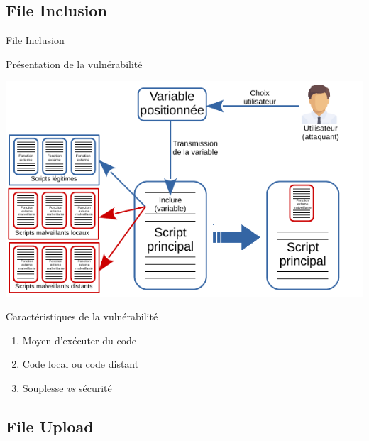 \documentclass[8pt]{beamer}
\begin{document}
\subsection{File Inclusion}

\begin{frame}{File Inclusion}

\begin{block}{Présentation de la vulnérabilité}

\begin{center}
	\includegraphics[scale=.8]{../images/include_hacked.pdf}
\end{center}

\end{block}

\begin{block}{Caractéristiques de la vulnérabilité}
	\begin{enumerate}[\ding{217}]
		\item Moyen d'exécuter du code
		\item Code local ou code distant
		\item Souplesse \textit{vs} sécurité
	\end{enumerate}
\end{block}

\end{frame}

\subsection{File Upload}
\end{document}
